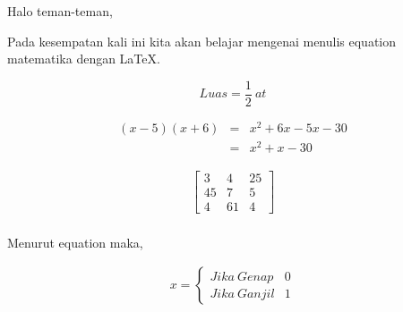 \documentclass[12pt, times new roman]{article}
\begin{document}
Halo teman-teman,

Pada kesempatan kali ini kita akan belajar mengenai menulis equation matematika dengan LaTeX.

\begin{equation*}
  Luas = \frac{1}{2}\>at
\end{equation*}

\begin{eqnarray}
  (x - 5) (x + 6) & = & x^2 + 6x - 5x - 30 \\
                  & = & x^2 + x - 30
\end{eqnarray}

\begin{eqnarray}
  \begin{bmatrix}
    3  & 4  & 25 \\
    45 & 7  & 5  \\
    4  & 61 & 4
  \end{bmatrix}
\end{eqnarray}
\\
Menurut equation maka,

\begin{eqnarray}
  x = \left \{ \begin{array}{lr}
      Jika \> Genap & 0 \\
      Jika \> Ganjil & 1
    \end{array}\right.
\end{eqnarray}
\end{document}
